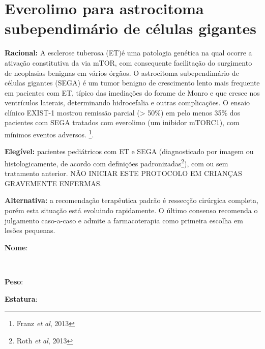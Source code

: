 \documentclass[11pt,a4paper,oldfontcommands]{memoir}
\def\entrywithlabel[#1]#2{\parbox{#1}{{\small #2:} \hrulefill}}
\begin{document}
\section{Everolimo para astrocitoma subependimário de células gigantes}
{\let\thefootnote\relax{}}

\textbf{Racional:} A esclerose tuberosa (ET)é uma patologia genética na qual ocorre a ativação constitutiva da via mTOR, com consequente facilitação do surgimento de neoplasias benignas em vários órgãos. O astrocitoma subependimário de células gigantes (SEGA) é um tumor benigno de crescimento lento mais frequente em pacientes com ET, típico das imediações do forame de Monro e que cresce nos ventrículos laterais, determinando hidrocefalia e outras complicações. O ensaio clínico EXIST-1 mostrou remissão parcial (> 50\%) em pelo menos 35\% dos pacientes com SEGA tratados com everolimo (um inibidor mTORC1), com mínimos eventos adversos. \footnote{Franz \textit{et al}, 2013}.

\textbf{Elegível:} pacientes pediátricos com ET e SEGA (diagnosticado por imagem ou histologicamente, de acordo com definições padronizadas\footnote{Roth \textit{et al}, 2013}), com ou sem tratamento anterior. NÃO INICIAR ESTE PROTOCOLO EM CRIANÇAS GRAVEMENTE ENFERMAS.

\textbf{Alternativa:} a recomendação terapêutica padrão é ressecção cirúrgica completa, porém esta situação está evoluindo rapidamente. O último consenso recomenda o julgamento caso-a-caso e admite a farmacoterapia como primeira escolha em lesões pequenas.
\\[0.4cm]
\entrywithlabel[1\hsize]{\textbf{Nome}}\hfill
\\[0.3cm]
\entrywithlabel[.45\hsize]{\textbf{Peso}}\hfill  \entrywithlabel[.45\hsize]{\textbf{Estatura}}
\end{document}
